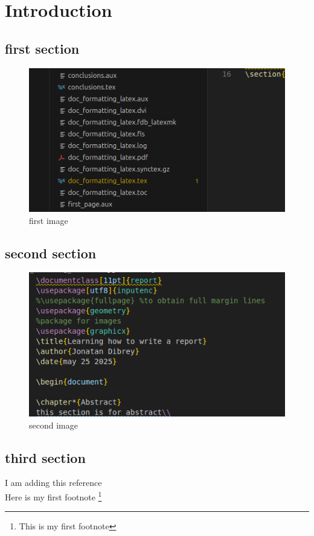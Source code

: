 \chapter{Introduction}

\section{first section}
\begin{figure}[ht]
    \centering
    \includegraphics{../images/im1.png}
    \caption{first image}
    \label{fig: Documentation folder}
\end{figure}
\section{second section}
\begin{figure}[ht]
    \centering
    \includegraphics{../images/im2.png}
    \caption{second image}
    \label{fig: A report picture}
\end{figure}
\section{third section}

I am adding this reference \cite{Kopka:latex:4e} \\[80pt]


Here is my first footnote \footnote{This is my first footnote}

